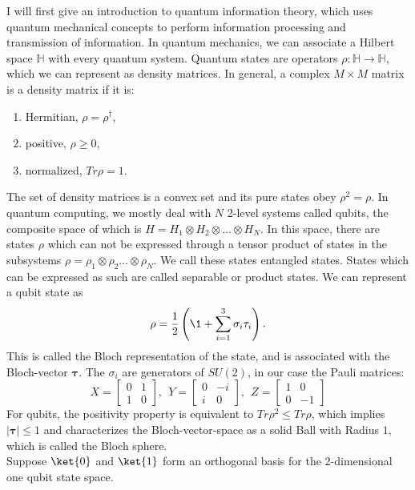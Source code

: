 I will first give an introduction to quantum information theory, which uses quantum mechanical concepts to perform information processing and transmission of information.
In quantum mechanics, we can associate a Hilbert space $\mathbb{H}$ with every quantum system.
Quantum states are operators $\rho :\mathbb{H}\to\mathbb{H}$, which we can represent as density matrices.
In general, a complex $M \times M$ matrix is a density matrix if it is:
\begin{center}\begin{enumerate}
	\item Hermitian,	$\rho =\rho^{\dagger}$,
	\item positive,		$\rho \ge 0$,
	\item normalized, 	$Tr\rho = 1$.
\end{enumerate}\end{center}
The set of density matrices is a convex set and its pure states obey $\rho^2 = \rho$.
In quantum computing, we mostly deal with $N$ 2-level systems called qubits, the composite space of which is $H = H_1 \otimes H_2 \otimes \ldots \otimes H_N$.
In this space, there are states $\rho$ which can not be expressed through a tensor product of states in the subsystems $\rho = \rho_1\otimes\rho_2\ldots\otimes\rho_N$.
We call these states entangled states.
States which can be expressed as such are called separable or product states.
We can represent a qubit state as \[
	\rho= \frac{1}{2}\left( \1 + \sum_{i=1}^{3} \sigma_i\tau_i \right)
.\]
This is called the Bloch representation of the state, and is associated with the Bloch-vector $\bm{\tau}$.
The $\sigma_i$ are generators of $SU\left( 2 \right) $, in our case the Pauli matrices:
$$
 X = \begin{bmatrix} 0 & 1 \\
                    1 & 0
        \end{bmatrix},~
	~Y = \begin{bmatrix} 0 & -i \\
                    i & 0
         \end{bmatrix},~
    ~Z = \begin{bmatrix} 1 & 0 \\
                    0 & -1
        \end{bmatrix}
$$
For qubits, the positivity property is equivalent to $Tr\rho^2\le Tr\rho$, which implies $|\bm{\tau}|\le 1$ and characterizes the Bloch-vector-space as a solid Ball with Radius $1$, which is called the Bloch sphere.\\
Suppose $\ket{0}$ and $\ket{1}$ form an orthogonal basis for the $2$-dimensional one qubit state space.

